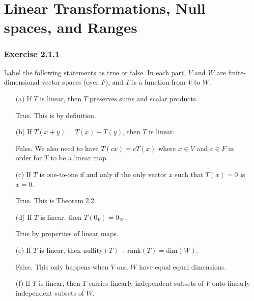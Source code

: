 \section{Linear Transformations, Null spaces, and Ranges}

\subsubsection{Exercise 2.1.1} Label the following statements as true or false. In each part, \( V  \) and \( W  \) are finite-dimensional vector spaces (over \( F \)), and \( T  \) is a function from \( V  \) to \( W  \).
\begin{enumerate}
    \item[(a)] If \( T  \) is linear, then \( T  \) preserves sums and scalar products.
        \begin{solution}
           True. This is by definition.
        \end{solution}
    \item[(b)] If \( T(x+y) = T(x) + T(y)   \), then \( T  \) is linear.
        \begin{solution}
            False. We also need to have \( T(cx) = cT(x)  \) where \( x \in V  \) and \( c \in F  \) in order for \( T  \) to be a linear map.
        \end{solution}
    \item[(c)] If \( T  \) is one-to-one if and only if the only vector \( x  \) such that \( T(x) = 0  \) is \( x = 0  \).
        \begin{solution}
            True. This is Theorem 2.2.
        \end{solution}
    \item[(d)] If \( T  \) is linear, then \( T(0_{V}) = 0_{W} \).
        \begin{solution}
            True by properties of linear maps.
        \end{solution}
    \item[(e)] If \( T  \) is linear, then \( \text{nullity}(T) + \text{rank}(T) = \text{dim}(W) \).
        \begin{solution}
         False. This only happens when \( V  \) and \( W  \) have equal equal dimensions.   
        \end{solution}
    \item[(f)] If \( T  \) is linear, then \( T  \) carries linearly independent subsets of \( V  \) onto linearly independent subsets of \( W  \).
        \begin{solution}

\end{solution}
\end{enumerate}

